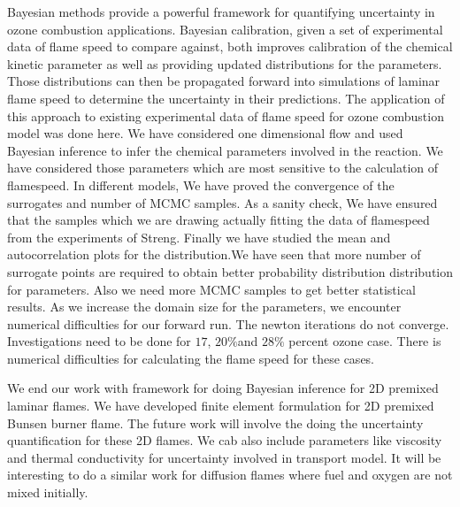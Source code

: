  Bayesian methods provide a powerful framework for quantifying uncertainty in ozone
combustion applications. Bayesian calibration, given a set of experimental data of flame speed to compare
against, both improves calibration of the chemical kinetic parameter as well as providing
updated distributions for the parameters. Those distributions can then be
propagated forward into simulations of laminar flame speed to determine the uncertainty in
their predictions. The application of this approach to existing experimental data of flame speed for ozone combustion model was done here.
 We have considered one dimensional flow and used Bayesian inference to infer the chemical parameters involved in the reaction. We have considered those parameters which are most sensitive to the calculation of flamespeed. In different models, We have proved the convergence of the surrogates and  number of MCMC samples. As a sanity check, We have ensured that the samples which we are drawing actually fitting the data of flamespeed from the experiments of Streng\cite{Streng}. Finally we have studied the mean and autocorrelation plots for the distribution.We have seen that more number of surrogate points are required to obtain better probability distribution distribution for parameters. Also we need more MCMC samples to get better statistical results. As we increase the domain size for the parameters, we encounter numerical difficulties for our forward run. The newton iterations do not converge. Investigations need to be done for $17$, $20 \% $and $ 28 \% $ percent ozone case. There is numerical difficulties for calculating the flame speed for these cases.

We end our work with  framework for doing Bayesian inference for 2D premixed laminar flames. We have developed finite element formulation for 2D premixed Bunsen burner flame. The future work will involve the doing the uncertainty quantification for these 2D flames. We cab also include parameters like viscosity and  thermal conductivity for uncertainty involved in transport model. It will be interesting to do a similar work for diffusion flames where fuel and oxygen are not mixed initially.


